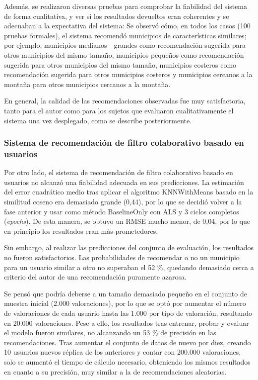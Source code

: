 Además, se realizaron diversas pruebas para comprobar la fiabilidad del sistema de forma cualitativa, y ver si los resultados devueltos eran coherentes y se adecuaban a la expectativa del sistema: Se observó cómo, en todos los casos (100 pruebas formales), el sistema recomendó municipios de características similares; por ejemplo, municipios medianos - grandes como recomendación sugerida para otros municipios del mismo tamaño, municipios pequeños como recomendación sugerida para otros municipios del mismo tamaño, municipios costeros como recomendación sugerida para otros municipios costeros y municipios cercanos a la montaña para otros municipios cercanos a la montaña.

En general, la calidad de las recomendaciones observadas fue muy satisfactoria, tanto para el autor como para los sujetos que evaluaron cualitativamente el sistema una vez desplegado, como se describe posteriormente.

\subsubsection{Sistema de recomendación de filtro colaborativo basado en usuarios}

Por otro lado, el sistema de recomendación de filtro colaborativo basado en usuarios no alcanzó una fiabilidad adecuada en sus predicciones. La estimación del error cuadrático medio tras aplicar el algoritmo KNNWithMeans basado en la similitud coseno era demasiado grande (0,44), por lo que se decidió volver a la fase anterior y usar como método BaselineOnly con ALS y 3 ciclos completos (\textit{epochs}). De esta manera, se obtuvo un RMSE mucho menor, de 0,04, por lo que en principio los resultados eran más prometedores.


Sin embargo, al realizar las predicciones del conjunto de evaluación, los resultados no fueron satisfactorios. Las probabilidades de recomendar o no un municipio para un usuario similar a otro no superaban el 52 \%, quedando demasiado cerca a criterio del autor de una recomendación puramente azarosa.

Se pensó que podría deberse a un tamaño demasiado pequeño en el conjunto de muestra inicial (2.000 valoraciones), por lo que se optó por aumentar el número de valoraciones de cada usuario hasta las 1.000 por tipo de valoración, resultando en 20.000 valoraciones. Pese a ello, los resultados tras entrenar, probar y evaluar el modelo fueron similares, no alcanzando un 53 \% de precisión en las recomendaciones. Tras aumentar el conjunto de datos de nuevo por diez, creando 10 usuarios nuevos réplica de los anteriores y contar con 200.000 valoraciones, solo se aumentó el tiempo de cálculo necesario, obteniendo los mismos resultados en cuanto a su precisión, muy similar a la de recomendaciones aleatorias.

